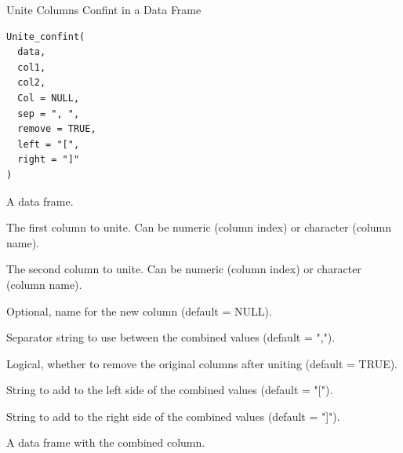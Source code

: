 \documentclass[a4paper]{book}
\begin{document}
%
\begin{Description}
Unite Columns Confint in a Data Frame
\end{Description}
%
\begin{Usage}
\begin{verbatim}
Unite_confint(
  data,
  col1,
  col2,
  Col = NULL,
  sep = ", ",
  remove = TRUE,
  left = "[",
  right = "]"
)
\end{verbatim}
\end{Usage}
%
\begin{Arguments}
\begin{ldescription}
\item[\code{data}] A data frame.

\item[\code{col1}] The first column to unite. Can be numeric (column index) or character (column name).

\item[\code{col2}] The second column to unite. Can be numeric (column index) or character (column name).

\item[\code{Col}] Optional, name for the new column (default = NULL).

\item[\code{sep}] Separator string to use between the combined values (default = ",").

\item[\code{remove}] Logical, whether to remove the original columns after uniting (default = TRUE).

\item[\code{left}] String to add to the left side of the combined values (default = "[").

\item[\code{right}] String to add to the right side of the combined values (default = "]").
\end{ldescription}
\end{Arguments}
%
\begin{Value}
A data frame with the combined column.
\end{Value}
%
\end{document}
